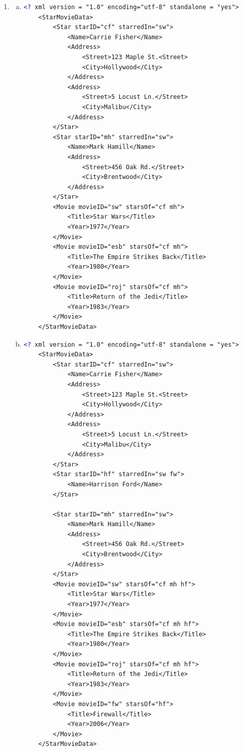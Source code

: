 \documentclass[12pt]{article}
\begin{document}
\begin{enumerate}[1.]
    \item

    \begin{enumerate}[a)]
        \item
    \begin{lstlisting}[language=XML]
    <? xml version = "1.0" encoding="utf-8" standalone = "yes">
    <StarMovieData>
        <Star starID="cf" starredIn="sw">
            <Name>Carrie Fisher</Name>
            <Address>
                <Street>123 Maple St.<Street>
                <City>Hollywood</City>
            </Address>
            <Address>
                <Street>5 Locust Ln.</Street>
                <City>Malibu</City>
            </Address>
        </Star>
        <Star starID="mh" starredIn="sw">
            <Name>Mark Hamill</Name>
            <Address>
                <Street>456 Oak Rd.</Street>
                <City>Brentwood</City>
            </Address>
        </Star>
        <Movie movieID="sw" starsOf="cf mh">
            <Title>Star Wars</Title>
            <Year>1977</Year>
        </Movie>
        <Movie movieID="esb" starsOf="cf mh">
            <Title>The Empire Strikes Back</Title>
            <Year>1980</Year>
        </Movie>
        <Movie movieID="roj" starsOf="cf mh">
            <Title>Return of the Jedi</Title>
            <Year>1983</Year>
        </Movie>
    </StarMovieData>
    \end{lstlisting}
        \item

    \begin{lstlisting}[language=XML]
    <? xml version = "1.0" encoding="utf-8" standalone = "yes">
    <StarMovieData>
        <Star starID="cf" starredIn="sw">
            <Name>Carrie Fisher</Name>
            <Address>
                <Street>123 Maple St.<Street>
                <City>Hollywood</City>
            </Address>
            <Address>
                <Street>5 Locust Ln.</Street>
                <City>Malibu</City>
            </Address>
        </Star>
        <Star starID="hf" starredIn="sw fw">
            <Name>Harrison Ford</Name>
        </Star>

        <Star starID="mh" starredIn="sw">
            <Name>Mark Hamill</Name>
            <Address>
                <Street>456 Oak Rd.</Street>
                <City>Brentwood</City>
            </Address>
        </Star>
        <Movie movieID="sw" starsOf="cf mh hf">
            <Title>Star Wars</Title>
            <Year>1977</Year>
        </Movie>
        <Movie movieID="esb" starsOf="cf mh hf">
            <Title>The Empire Strikes Back</Title>
            <Year>1980</Year>
        </Movie>
        <Movie movieID="roj" starsOf="cf mh hf">
            <Title>Return of the Jedi</Title>
            <Year>1983</Year>
        </Movie>
        <Movie movieID="fw" starsOf="hf">
            <Title>Firewall</Title>
            <Year>2006</Year>
        </Movie>
    </StarMovieData>
    \end{lstlisting}


\end{enumerate}
\end{enumerate}
\end{document}
